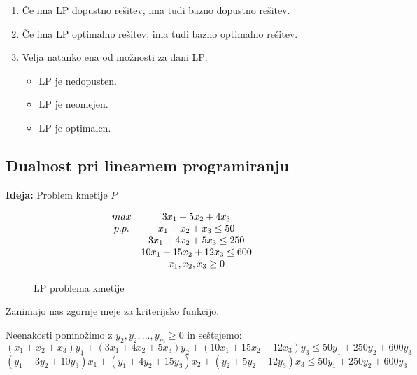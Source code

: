 \documentclass[11pt, a4paper]{article}
\begin{document}
    \begin{theorem}
        \(\)\\
        \begin{enumerate}
            \item Če ima LP dopustno rešitev, ima tudi bazno dopustno rešitev.
            \item Če ima LP optimalno rešitev, ima tudi bazno optimalno rešitev.
            \item Velja natanko ena od možnosti za dani LP:
            \begin{itemize}
                \item LP je nedopusten.
                \item LP je neomejen.
                \item LP je optimalen.
            \end{itemize}
        \end{enumerate}
    \end{theorem}
    \clearpage



    \subsection{Dualnost pri linearnem programiranju}

    \textbf{Ideja:} Problem kmetije \(P\)
    \begin{figure}[h!]
        \[
            \begin{array}{ c c }
                max & 3x_1+5x_2+4x_3 \\
                p.p. & x_1+x_2+x_3 \le 50 \\
                & 3x_1+4x_2+5x_3 \le 250 \\
                & 10x_1+15x_2+12x_3 \le 600 \\
                & x_1,x_2,x_3 \ge 0 \\
            \end{array}
        \]
        \caption{LP problema kmetije}
    \end{figure}

    Zanimajo nas zgornje meje za kriterijsko funkcijo. 
    \par
    Neenakosti pomnožimo z \(y_2,y_2,...,y_m \ge 0\) in seštejemo:
    \[(x_1+x_2+x_3)y_1+(3x_1+4x_2+5x_3)y_2+(10x_1+15x_2+12x_3)y_3 \le 50y_1+250y_2+600y_3\]
    \[(y_1+3y_2+10y_3)x_1+(y_1+4y_2+15y_3)x_2+(y_2+5y_2+12y_3)x_3 \le 50y_1+250y_2+600y_3\]
    
\end{document}

